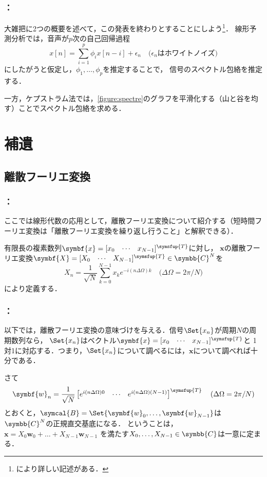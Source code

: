 \documentclass[unicode,11pt]{beamer}
\newcommand{\termdef}[1]{\alert{\sffamily #1}}
\newcommand{\impact}[1]{\alert{\sffamily #1}}
\newcommand{\numset}[1]{\symbb{#1}}
\newcommand{\trps}[1]{#1^{\symsfup{T}}}
\newcommand{\vb}[1]{\symbf{#1}}
\newcommand{\inlinevec}[1]{[\smash{\begin{matrix}#1\end{matrix}}]}
\newcommand{\basis}[1]{\symcal{#1}}
\begin{document}
\begin{frame}
  \frametitle{\secname ：\subsecname}
  大雑把に2つの概要を述べて，この発表を終わりとすることにしよう\footnote{\cite{takamichi2015,morise2018}により詳しい記述がある．}．
  線形予測分析では，音声が\(p\)次の\termdef{自己回帰過程}
  \[
    x[n] = \sum_{i=1}^p\phi_ix[n-i]+\epsilon_n
    \quad\text{(\(\epsilon_n\)はホワイトノイズ)}
  \]
  にしたがうと仮定し，\(\phi_1,\dots,\phi_p\)を推定することで，
  信号のスペクトル包絡を推定する．

  一方，ケプストラム法では，\cref{figure:spectre}のグラフを平滑化する（山と谷を均す）ことでスペクトル包絡を求める．
\end{frame}

\section{補遺}
\subsection{離散フーリエ変換}
\begin{frame}
  \frametitle{\secname ：\subsecname}
  \begin{block}{\subsecname}
    ここでは線形代数の応用として，離散フーリエ変換について紹介する（短時間フーリエ変換は「離散フーリエ変換を繰り返し行うこと」と解釈できる）．

    \begin{definition}[離散フーリエ変換]
      有限長の複素数列\(\vb{x}=\trps{\inlinevec{x_0 & \cdots & x_{N-1}}}\)に対し，
      \(\vb{x}\)の\termdef{離散フーリエ変換}\(\vb{X}=\trps{\inlinevec{X_0 & \cdots & X_{N-1}}}\in\numset{C}^N\)を
      \[
        X_n = \frac{1}{\sqrt{N}}\sum_{k=0}^{N-1}x_ke^{-i(n\Delta\Omega)k}
        \quad\text{(\(\Delta\Omega=2\pi/N\))}
      \]
      により定義する．
    \end{definition}
  \end{block}
\end{frame}

\begin{frame}
  \frametitle{\secname ：\subsecname}
  以下では，離散フーリエ変換の意味づけを与える．信号\(\Set{x_n}\)が周期\(N\)の周期数列なら，
  \(\Set{x_n}\)はベクトル\(\vb{x}=\trps{\inlinevec{x_0 & \cdots & x_{N-1}}}\)と
  1対1に対応する．つまり，\(\Set{x_n}\)について調べるには，\(\vb{x}\)について調べれば十分である．

  さて
  \[
    \vb{w}_n = \frac{1}{\sqrt{N}}\trps{\begin{bmatrix}e^{i(n\Delta\Omega)0} & \cdots & e^{i(n\Delta\Omega)(N-1)}\end{bmatrix}}
    \quad\text{(\(\Delta\Omega=2\pi/N\))}
  \]
  とおくと，\impact{\(\basis{B}=\Set{\vb{w}_0,\dots,\vb{w}_{N-1}}\)は\(\numset{C}^N\)の正規直交基底になる}．
  ということは，\(\vb{x}=X_0\vb{w}_0+\dots+X_{N-1}\vb{w}_{N-1}\)
  を満たす\(X_0,\dots,X_{N-1}\in\numset{C}\)は一意に定まる．
\end{frame}
\end{document}

